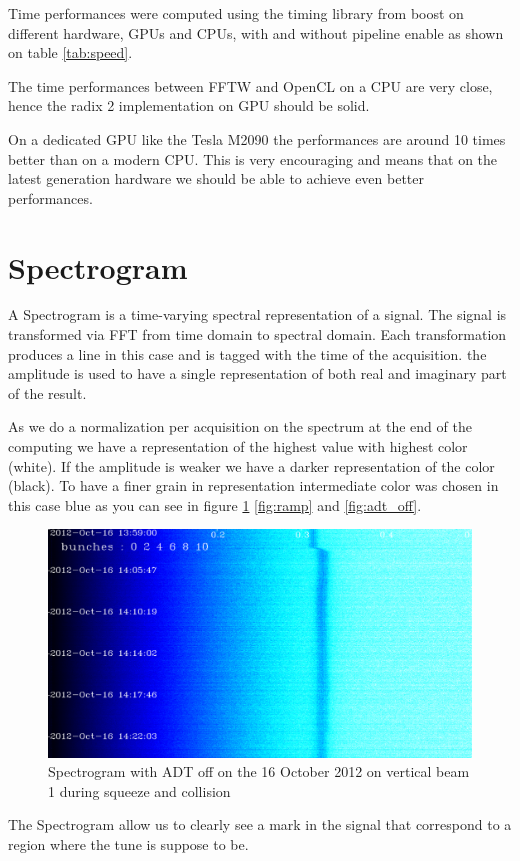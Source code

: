 Time performances were computed using the timing library from boost \cite{boost} on different hardware, \glspl{GPU} and \glspl{CPU}, with and without pipeline enable as shown on table \ref{tab:speed}.

The time performances between \gls{FFTW} and \gls{OpenCL} on a \gls{CPU} are very close, hence the radix 2 implementation on \gls{GPU} should be solid.

On a dedicated \gls{GPU} like the Tesla M2090  the performances are around 10 times better than on a modern \gls{CPU}. This is very encouraging and means that on the latest generation hardware we should be able to achieve even better performances.

\section{Spectrogram}
\label{sec:spectrogram}

A Spectrogram is a time-varying spectral representation of a signal. The signal is transformed via \gls{FFT} from time domain to spectral domain. Each transformation produces a line in this case and is tagged with the time of the acquisition. the amplitude is used to have a single representation of both real and imaginary part of the result.

As we do a normalization per acquisition on the spectrum at the end of the computing we have a representation of the highest value with highest color (white). If the amplitude is weaker we have a darker representation of the color (black). To have a finer grain in representation intermediate color was chosen in this case blue as you can see in figure \ref{fig:squeeze} \ref{fig:ramp} and \ref{fig:adt_off}.

\begin{figure}[H]
\caption{Spectrogram with ADT off on the 16 October 2012 on vertical beam 1 during squeeze and collision}
\label{fig:squeeze}
\centering
\includegraphics[scale=0.3]{md-121016-vb1-m1-6bunches-10acc-1359-1425-collision.pdf}
\end{figure}

The Spectrogram allow us to clearly see a mark in the signal that correspond to a region where the tune is suppose to be.
